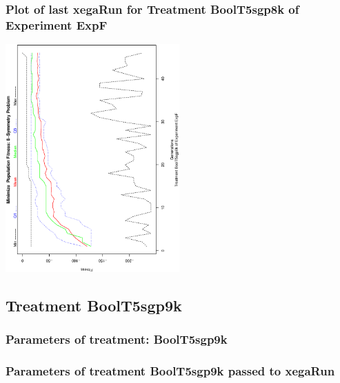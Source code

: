 \documentclass[18pt,c]{beamer}
\begin{document}
 \begin{frame}
 \frametitle{ Plot of last xegaRun for Treatment BoolT5sgp8k of Experiment ExpF }
 \begin{center}
\includegraphics[width=0.5\textwidth, angle=-90]
{ExpFPlotPopStatsFigure009.eps}
 \end{center}
 \label{report/ExpFPlotPopStatsFigure009.eps}  
 \end{frame}

\clearpage
\subsection{Treatment BoolT5sgp9k}

 \begin{frame}
 \fontsize{8pt}{9pt}\selectfont
 \frametitle{  Parameters of treatment: BoolT5sgp9k 
 }

 \label{ExpFtParmTable040.tex}  
 \end{frame}


 \begin{frame}
 \fontsize{8pt}{9pt}\selectfont
 \frametitle{  Parameters of treatment BoolT5sgp9k passed to xegaRun
 }

 \label{ExpFtParmTable041.tex}  
 \end{frame}
\end{document}
